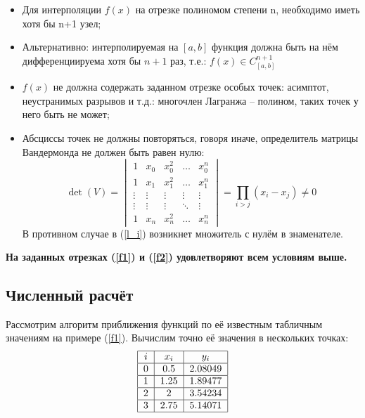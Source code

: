 \begin{itemize}
    \item Для интерполяции $f(x)$ на отрезке полиномом степени n, необходимо иметь хотя бы n+1 узел;
    \item Альтернативно: интерполируемая на $[a,b]$ функция должна быть на нём дифференциируема хотя бы $n+1$ раз, т.е.: $f(x)\in C^{n+1}_{[a,b]}$
    \item $f(x)$ не должна содержать заданном отрезке особых точек: асимптот, неустранимых разрывов и т.д.: многочлен Лагранжа -- полином, таких точек у него быть не может;
    \item Абсциссы точек не должны повторяться, говоря иначе, определитель матрицы Вандермонда не должен быть равен нулю:
    \begin{equation}
        \det(V) =
        \begin{vmatrix}
            1 & x_0 & x_0^2 & \hdots & x_0^n \\
            1 & x_1 & x_1^2 & \hdots & x_1^n \\
            \vdots & \vdots & \vdots & \vdots & \vdots \\
            \vdots & \vdots & \vdots & \ddots & \vdots \\
            1 & x_n & x_n^2 & \hdots & x_n^n
        \end{vmatrix} =
        \prod_{i>j}{(x_i-x_j)} \ne 0
    \end{equation}
    В противном случае в (\ref{l_i}) возникнет множитель с нулём в знаменателе.
\end{itemize}
{\bf На заданных отрезках (\ref{f1}) и (\ref{f2}) удовлетворяют всем условиям выше.}

\subsection{Численный расчёт}
Рассмотрим алгоритм приближения функций по её известным табличным значениям на примере (\ref{f1}). Вычислим точно её значения в нескольких точках:
\begin{align}
    \label{4nodes_f1}
    \begin{tabular}{|c|c|c|}
        \hline
        $i$ & $x_i$ & $y_i$ \\
        \hline
        0 & 0.5 & 2.08049 \\
        \hline
        1 & 1.25 & 1.89477 \\
        \hline
        2 & 2 & 3.54234 \\
        \hline
        3 & 2.75 & 5.14071 \\
        \hline
    \end{tabular}
\end{align}

